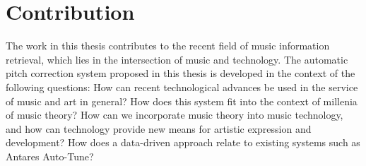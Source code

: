 \section{Contribution}

The work in this thesis contributes to the recent field of music information retrieval, which lies in the intersection of music and technology. The automatic pitch correction system proposed in this thesis is developed in the context of the following questions: How can recent technological advances be used in the service of music and art in general? How does this system fit into the context of millenia of music theory? How can we incorporate music theory into music technology, and how can technology provide new means for artistic expression and development? How does a data-driven approach relate to existing systems such as Antares Auto-Tune? 

